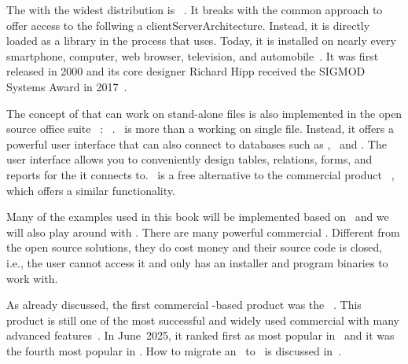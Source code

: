The   with the widest distribution is \sqlite~\cite{WB2019RHSOOS,GPBHKP2022SPPAF,C20245YOQ,HWACIS:HO2023WKUOS}.
It breaks with the common approach to offer access to the  follwing a \gls{clientServerArchitecture}.
Instead, it is directly loaded as a library in the process that uses.
Today, it is installed on nearly every smartphone, computer, web browser, television, and automobile~\cite{WB2019RHSOOS,GPBHKP2022SPPAF,C20245YOQ}.
It was first released in 2000 and its core designer Richard Hipp received the SIGMOD Systems Award in 2017~\cite{C20245YOQ}.

The concept of  that can work on stand-alone files is also implemented in the open source office suite \libreoffice~\cite{DF2024LTDF,GL2012LTSOOSSCBAFACSOL,S2022L7PFEUU}: \libreofficeBase~\cite{FNFHWSKLSSGLFRSRPLJG2022BG7R1BOL7C,S2022L7PFEUU}.
\libreofficeBase\ is more than a  working on single file.
Instead, it offers a powerful user interface that can also connect to databases such as \mysql, \mariadb\ and \postgresql.
The user interface allows you to conveniently design tables, relations, forms, and reports for the  it connects to.
\libreofficeBase\ is a free alternative to the commercial product \microsoftAccess~\cite{SSI2023MA2BTA,B2020HOMA2,UC2021AFD}, which offers a similar functionality.

Many of the examples used in this book will be implemented based on \postgresql\ and we will also play around with \libreofficeBase.%
%
\endhsection%
%
%
%
There are many powerful commercial .
Different from the open source solutions, they do cost money and their source code is closed, i.e., the user cannot access it and only has an installer and program binaries to work with.

As already discussed, the first commercial -based product was the \oracleDB~\cite{C20245YOQ,O2007OTHTMIMIOHWCFTPWMIH}.
This product is still one of the most successful and widely used commercial  with many advanced features~\cite{BBDDSY2011ADOODM,KK2021EODATASFHPAP}.
In June~2025, it ranked first as most popular  in~\cite{RS2025DERORD} and it was the fourth most popular  in \cite{PMPVEPWGSMB2025ATAODMSTTHOOSP}.
How to migrate an \oracleDB\ to \postgresql\ is discussed in~\cite{KO2023DMFOTP}.

